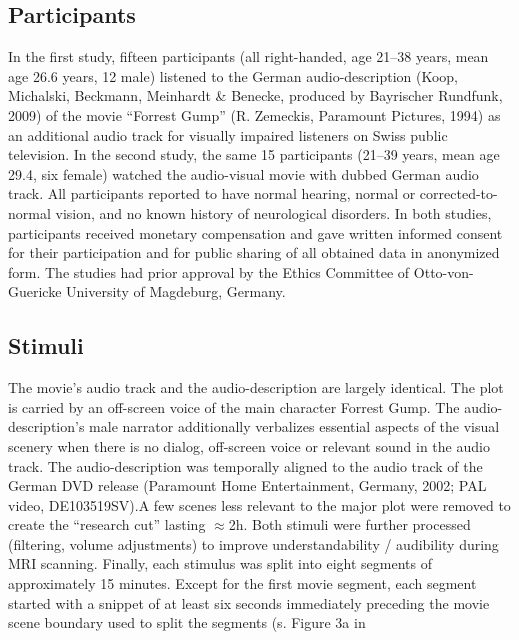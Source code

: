 \documentclass[english]{article}
\begin{document}


\subsection{Participants}
In the first  study, fifteen participants (all right-handed, age 21–38 years, mean age 26.6 years, 12 male) listened to the German audio-description (Koop, Michalski, Beckmann, Meinhardt \& Benecke, produced by Bayrischer Rundfunk, 2009) of the movie ``Forrest Gump'' (R. Zemeckis, Paramount Pictures, 1994) as an additional audio track for visually impaired listeners on Swiss public television. In the second study, the same 15 participants (21–39 years, mean age 29.4, six female) watched the audio-visual movie with dubbed German audio track. All participants reported to have normal hearing, normal or corrected-to-normal vision, and no known history of neurological disorders. In both studies, participants received monetary compensation and gave written informed consent for their participation and for public sharing of all obtained data in anonymized form. The studies had prior approval by the Ethics Committee of Otto-von-Guericke University of Magdeburg, Germany.


\subsection{Stimuli}
The movie's audio track and the audio-description are largely identical. The plot is carried by an off-screen voice of the main character Forrest Gump.
The audio-description's male narrator additionally verbalizes essential aspects of the visual scenery when there is no dialog, off-screen voice or relevant sound in the audio track.
The audio-description was temporally aligned to the audio track of the German DVD release (Paramount Home Entertainment, Germany, 2002; PAL video, DE103519SV).A few scenes less relevant to the major plot were removed to create the ``research cut'' lasting $\approx$2h. Both stimuli were further processed (filtering, volume adjustments) to improve understandability / audibility during MRI scanning.
Finally, each stimulus was split into eight segments of approximately 15 minutes. Except for the first movie segment, each segment started with a snippet of at least six seconds immediately preceding the movie scene boundary used to split the segments (s. Figure 3a in \citep{hanke2014audiomovie}
\end{document}
